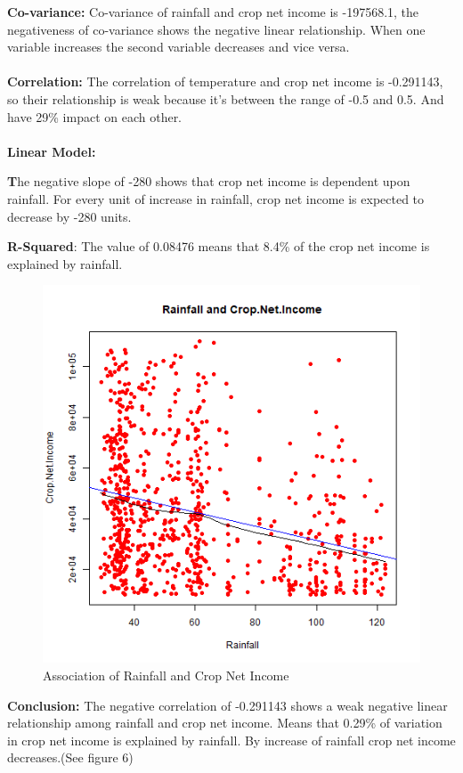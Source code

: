 \documentclass[12pt, a4paper]{article}
\begin{document}
\justify
\textbf{Co-variance:} Co-variance of rainfall and crop net income is -197568.1, the negativeness of co-variance shows the negative linear relationship. When one variable increases the second variable decreases and vice versa.\\
\\
\textbf{Correlation:} The correlation of temperature and crop net income is -0.291143, so their relationship is weak because it's between the range of -0.5 and 0.5. And have 29\% impact on each other. \\
\\
\textbf{Linear Model: } 

\item \textbf The negative slope of -280 shows that crop net income is dependent upon rainfall. For every unit of increase in rainfall, crop net income is expected to decrease by -280 units. 


\justify
\textbf{R-Squared}: The value of 0.08476 means that 8.4\% of the crop net income is explained by rainfall.

\begin{figure}[H]
\centering
\includegraphics[trim={0 0 0 0}, scale=0.7, clip]{rainfall_Income.png}
\caption{Association of Rainfall and Crop Net Income}
\end{figure}

\justify
\textbf{Conclusion:} The negative correlation of -0.291143 shows a weak negative linear relationship among rainfall and crop net income. Means that 0.29\% of variation in crop net income is explained by rainfall. By increase of rainfall crop net income decreases.(See figure 6) \\
\end{document}
